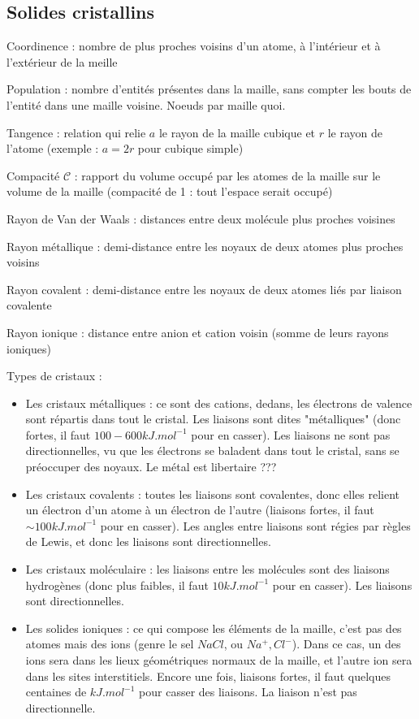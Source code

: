 \documentclass[a4paper,12pt]{book}
\newcommand{\Def}[2]{\begin{tcolorbox}[colback=white,colframe=red!10!green!20!blue!75!, title=Définition : #1]#2\end{tcolorbox}}
\begin{document}
\subsection{Solides cristallins}
\Def{Grandeurs}{Coordinence : nombre de plus proches voisins d'un atome, à l'intérieur et à l'extérieur de la meille
\par Population : nombre d'entités présentes dans la maille, sans compter les bouts de l'entité dans une maille voisine. Noeuds par maille quoi.
\par Tangence : relation qui relie $a$ le rayon de la maille cubique et $r$ le rayon de l'atome (exemple : $a = 2r$ pour cubique simple)
\par Compacité $\mathcal{C}$ : rapport du volume occupé par les atomes de la maille sur le volume de la maille (compacité de 1 : tout l'espace serait occupé)
\par Rayon de Van der Waals : distances entre deux molécule plus proches voisines
\par Rayon métallique : demi-distance entre les noyaux de deux atomes plus proches voisins
\par Rayon covalent : demi-distance entre les noyaux de deux atomes liés par liaison covalente
\par Rayon ionique : distance entre anion et cation voisin (somme de leurs rayons ioniques)}

\Def{Types de cristaux}{Types de cristaux :\begin{itemize}
\item Les cristaux métalliques : ce sont des cations, dedans, les électrons de valence sont répartis dans tout le cristal. Les liaisons sont dites "métalliques" (donc fortes, il faut $100-600kJ.mol^{-1}$ pour en casser). Les liaisons ne sont pas directionnelles, vu que les électrons se baladent dans tout le cristal, sans se préoccuper des noyaux. Le métal est libertaire ???
\item Les cristaux covalents : toutes les liaisons sont covalentes, donc elles relient un électron d'un atome à un électron de l'autre (liaisons fortes, il faut $\sim100kJ.mol^{-1}$ pour en casser). Les angles entre liaisons sont régies par règles de Lewis, et donc les liaisons sont directionnelles.
\item Les cristaux moléculaire : les liaisons entre les molécules sont des liaisons hydrogènes  (donc plus faibles, il faut $10kJ.mol^{-1}$ pour en casser). Les liaisons sont directionnelles.
\item Les solides ioniques : ce qui compose les éléments de la maille, c'est pas des atomes mais des ions (genre le sel $NaCl$, ou $Na^+, Cl^-$). Dans ce cas, un des ions sera dans les lieux géométriques normaux de la maille, et l'autre ion sera dans les sites interstitiels. Encore une fois, liaisons fortes, il faut quelques centaines de $kJ.mol^{-1}$ pour casser des liaisons. La liaison n'est pas directionnelle.
\end{itemize}}
\end{document}

